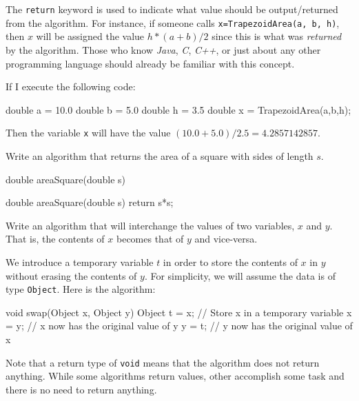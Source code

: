 The \verb+return+ keyword  is used
to indicate what value should be output/returned 
from the algorithm. For instance, if someone calls \verb+x=TrapezoidArea(a, b, h)+,
then $x$ will be assigned the value $h*(a+b)/2$ since this is what was {\em returned} by the algorithm.
Those who know {\em Java}, {\em C}, {\em C++}, or just about any other programming language 
should already be familiar with this concept.

\begin{exa}
If I execute the following code:
\begin{code}
double a = 10.0
double b = 5.0
double h = 3.5
double x = TrapezoidArea(a,b,h);
\end{code}
Then the variable \verb+x+ will have the value 
$(10.0+5.0)/2.5=4.2857142857.$
\end{exa}

\begin{exer}
Write an algorithm that returns the area of a square with sides of length $s$.
\begin{code}
double areaSquare(double s) {


}
\end{code}
\begin{answer}
\begin{code}
double areaSquare(double s) { return s*s; }
\end{code}
\end{answer}
\end{exer}


\begin{exa} \label{exa:swapping1}
Write an algorithm that will interchange the values of two
variables, $x$ and $y$. 
That is, the contents of $x$ becomes that of $y$ and vice-versa.
\begin{sol}
We introduce a temporary variable $t$ in order to store
the contents of $x$ in $y$ without erasing the contents of $y$.
For simplicity, we will assume the data is of type \verb+Object+.
Here is the algorithm:
\begin{code}
  void swap(Object x, Object y) {
      Object t = x;  // Store x in a temporary variable
      x = y;      // x now has the original value of y
      y = t;      // y now has the original value of x
  }
\end{code}
\end{sol}
\end{exa}

\begin{rem}
Note that a return type of \verb+void+ means that
the algorithm does not return anything.
While some algorithms return values, other accomplish
some task and there is no need to return anything.
\end{rem}

